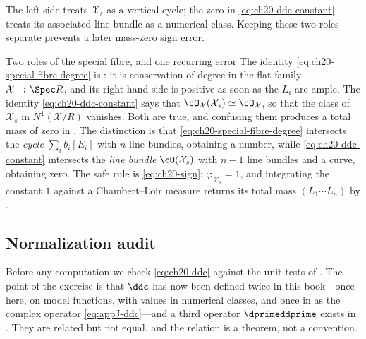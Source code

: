 The left side treats \(\mathcal X_s\) as a vertical cycle; the zero in
\eqref{eq:ch20-ddc-constant} treats its associated line bundle as a
numerical class.  Keeping these two roles separate prevents a later
mass-zero sign error.

\begin{warning}{Two roles of the special fibre, and one recurring error}
The identity \eqref{eq:ch20-special-fibre-degree} is
: it is conservation of degree in the flat
family \(\mathcal X\to\Spec R\), and its right-hand side is positive as soon
as the \(L_i\) are ample.  The identity \eqref{eq:ch20-ddc-constant} says
that \(\cO_{\mathcal X}(\mathcal X_s)\simeq\cO_{\mathcal X}\), so that the
class of \(\mathcal X_s\) in \(N^1(\mathcal X/R)\) vanishes.  Both are true,
and confusing them produces a total mass of zero in
.  The distinction is that
\eqref{eq:ch20-special-fibre-degree} intersects the \emph{cycle}
\(\sum_ib_i[E_i]\) with \(n\) line bundles, obtaining a number, while
\eqref{eq:ch20-ddc-constant} intersects the \emph{line bundle}
\(\cO(\mathcal X_s)\) with \(n-1\) line bundles and a curve, obtaining
zero.  The safe rule is \eqref{eq:ch20-sign}: \(\varphi_{\mathcal X_s}=1\),
and integrating the constant \(1\) against a Chambert--Loir measure returns
its total mass \((L_1\cdots L_n)\) by
.
\end{warning}

\subsection{Normalization audit}
\label{sec:ch20-normalization-audit}

Before any computation we check \eqref{eq:ch20-ddc} against the unit tests
of .  The point of the exercise is that
\(\ddc\) has now been defined twice in this book---once here, on model
functions, with values in numerical classes, and once in
 as the complex operator
\eqref{eq:appJ-ddc}---and a third operator \(\dprimeddprime\) exists in
.  They are related but not equal, and the relation is a
theorem, not a convention.

